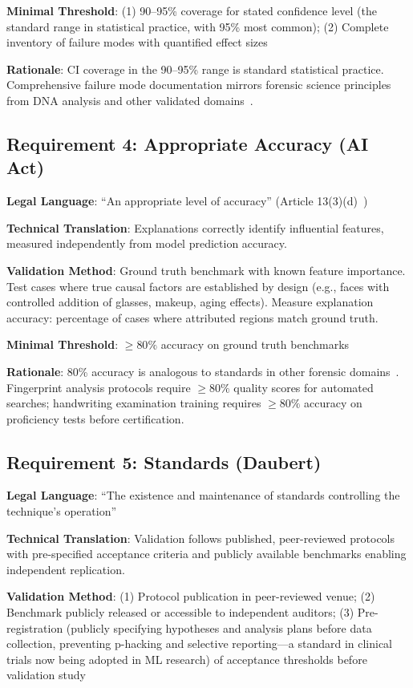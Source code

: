 \textbf{Minimal Threshold}: (1) 90--95\% coverage for stated confidence level (the standard range in statistical practice, with 95\% most common); (2) Complete inventory of failure modes with quantified effect sizes

\textbf{Rationale}: CI coverage in the 90--95\% range is standard statistical practice. Comprehensive failure mode documentation mirrors forensic science principles from DNA analysis and other validated domains~\cite{nrc2009}.

\subsection{Requirement 4: Appropriate Accuracy (AI Act)}

\textbf{Legal Language}: ``An appropriate level of accuracy'' (Article 13(3)(d)~\cite{euaiact2024})

\textbf{Technical Translation}: Explanations correctly identify influential features, measured independently from model prediction accuracy.

\textbf{Validation Method}: Ground truth benchmark with known feature importance. Test cases where true causal factors are established by design (e.g., faces with controlled addition of glasses, makeup, aging effects). Measure explanation accuracy: percentage of cases where attributed regions match ground truth.

\textbf{Minimal Threshold}: $\geq 80\%$ accuracy on ground truth benchmarks

\textbf{Rationale}: 80\% accuracy is analogous to standards in other forensic domains~\cite{nrc2009}. Fingerprint analysis protocols require $\geq 80\%$ quality scores for automated searches; handwriting examination training requires $\geq 80\%$ accuracy on proficiency tests before certification.

\subsection{Requirement 5: Standards (Daubert)}

\textbf{Legal Language}: ``The existence and maintenance of standards controlling the technique's operation''

\textbf{Technical Translation}: Validation follows published, peer-reviewed protocols with pre-specified acceptance criteria and publicly available benchmarks enabling independent replication.

\textbf{Validation Method}: (1) Protocol publication in peer-reviewed venue; (2) Benchmark publicly released or accessible to independent auditors; (3) Pre-registration (publicly specifying hypotheses and analysis plans before data collection, preventing p-hacking and selective reporting—a standard in clinical trials now being adopted in ML research) of acceptance thresholds before validation study

